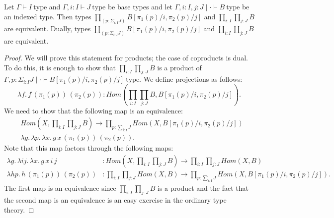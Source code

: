 \documentclass[reqno]{amsart}
\theoremstyle{definition}
\theoremstyle{remark}
\newcommand{\type}{\mathrm{type}}
\newcommand{\ob}{\mathrm{type}}
\newcommand{\fs}[1]{\mathit{#1}}
\newcommand{\Hom}{\fs{Hom}}
\numberwithin{figure}{section}
\begin{document}
\begin{prop}
Let $\Gamma \vdash I\ \type$ and $\Gamma, i : I \vdash J\ \type$ be base types and let $\Gamma, i : I, j : J \mid \cdot \vdash B\ \ob$ be an indexed type.
Then types $\prod_{(p : \Sigma_{i : I} J)} B[\pi_1(p)/i, \pi_2(p)/j]$ and $\prod_{i : I} \prod_{j : J} B$ are equivalent.
Dually, types $\coprod_{(p : \Sigma_{i : I} J)} B[\pi_1(p)/i, \pi_2(p)/j]$ and $\coprod_{i : I} \coprod_{j : J} B$ are equivalent.
\end{prop}
\begin{proof}
We will prove this statement for products; the case of coproducts is dual.
To do this, it is enough to show that $\prod_{i : I} \prod_{j : J} B$ is a product of $\Gamma , p : \Sigma_{i : I} J \mid \cdot \vdash B[\pi_1(p)/i, \pi_2(p)/j]\ \ob$.
We define projections as follows:
\[ \lambda f.\,f\,(\pi_1(p))\,(\pi_2(p)) : \Hom(\prod_{i : I} \prod_{j : J} B, B[\pi_1(p)/i,\pi_2(p)/j]). \]
We need to show that the following map is an equivalence:
\begin{align*}
& \Hom(X, \prod_{i : I} \prod_{j : J} B) \to \prod_{p : \sum_{i : I} J} \Hom(X, B[\pi_1(p)/i,\pi_2(p)/j]) \\
& \lambda g.\,\lambda p.\,\lambda x.\,g\,x\,(\pi_1(p))\,(\pi_2(p)).
\end{align*}
Note that this map factors through the following maps:
\begin{align*}
\lambda g.\,\lambda i j.\,\lambda x.\,g\,x\,i\,j & : \Hom(X, \prod_{i : I} \prod_{j : J} B) \to \prod_{i : I} \prod_{j : J} \Hom(X,B) \\
\lambda h p.\,h\,(\pi_1(p))\,(\pi_2(p)) & : \prod_{i : I} \prod_{j : J} \Hom(X,B) \to \prod_{p : \sum_{i : I} J} \Hom(X, B[\pi_1(p)/i,\pi_2(p)/j]).
\end{align*}
The first map is an equivalence since $\prod_{i : I} \prod_{j : J} B$ is a product and the fact that the second map is an equivalence is an easy exercise in the ordinary type theory.
\end{proof}




\end{document}

